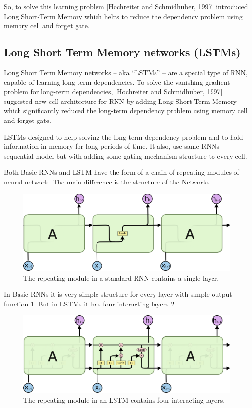  So, to solve this learning problem [Hochreiter and Schmidhuber, 1997] introduced Long Short-Term Memory which helps to reduce the dependency problem using memory cell and forget gate.
\newpage
\subsection{Long Short Term Memory networks (LSTMs)}


Long Short Term Memory networks – aka “LSTMs” – are a special type of RNN, capable of learning long-term dependencies. To solve the vanishing gradient problem for long-term dependencies, [Hochreiter and Schmidhuber, 1997]\cite{Hochreiter} suggested new cell architecture for RNN by adding Long Short Term Memory which significantly reduced the long-term dependency problem using memory cell and forget gate.

 LSTMs designed to help solving the long-term dependency problem and to hold information in memory for long periods of time. It also, use same RNNs sequential model but with adding some gating mechanism structure to every cell.

 Both Basic RNNs and LSTM have the form of a chain of repeating modules of neural network. The main difference is the structure of the Networks.
 
\begin{figure}[h!] \includegraphics[width=\linewidth]{./Figures/Ch_2_Background/LSTM-SimpleRNN.png}
  \caption{The repeating module in a standard RNN contains a single layer.\cite{colah}}
  \label{fig:LSTM-SimpleRNN}
\end{figure}

 In Basic RNNs it is very simple structure for every layer with simple output function \ref{fig:LSTM-SimpleRNN}. But in LSTMs it has four interacting layers \ref{fig:LSTM-cell-chaining}.


\begin{figure}[h!] \includegraphics[width=\linewidth]{./Figures/Ch_2_Background/LSTM-cell-chaining.png}
  \caption{The repeating module in an LSTM contains four interacting layers.\cite{colah}}
  \label{fig:LSTM-cell-chaining}
\end{figure}



